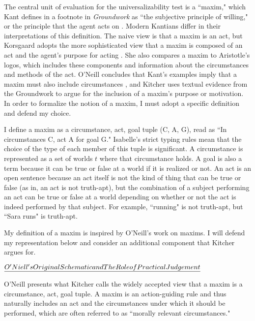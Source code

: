 \begin{isabellebody}
\begin{isamarkuptext}%
The central unit of evaluation for the universalizability test is a ``maxim," which Kant defines 
in a footnote in \emph{Groundwork} as ``the subjective principle of willing," or the principle that 
the agent acts on \cite[16]{groundwork}. Modern Kantians differ in their interpretations of this definition. The naive view 
is that a maxim is an act, but Korsgaard adopts the more sophisticated view that a maxim is composed
of an act and the agent's purpose for acting \cite{actingforareason}. She also compares a maxim 
to Aristotle's logos, which includes these components and information about the circumstances and methods 
of the act. O'Neill concludes that Kant's examples imply that a maxim must also include circumstances \cite{actingonprinciple}, and 
Kitcher \cite{whatisamaxim} uses textual evidence from the Groundwork to argue for the inclusion of a maxim's purpose 
or motivation. In order to formalize the notion of a maxim, I must adopt a specific definition and 
defend my choice.

I define a maxim as a circumstance, act, goal tuple (C, A, G), read 
as ``In circumstances C, act A for goal G." Isabelle's strict typing rules mean that the choice of the 
type of each member of this tuple is significant. A circumstance is represented as a set of worlds 
$t$ where that circumstance holds. A goal is also a term because it can be true or false at a world if it 
is realized or not. An act is an open sentence because an act itself is not the kind of thing that can 
be true or false (as in, an act is not truth-apt), but the combination of a subject performing an act 
can be true or false at a world depending on whether or not the act is indeed performed by that subject. 
For example, ``running" is not truth-apt, but ``Sara runs" is truth-apt.

My definition of a maxim is inspired by O'Neill's work on maxims. I will defend my representation
below and consider an additional component that Kitcher argues for.

$\emph{O'Niell's Original Schematic and The Role of Practical Judgement}$

O'Neill \cite[37]{actingonprinciple} presents what Kitcher \cite{whatisamaxim}  calls the widely accepted 
view that a maxim is a circumstance, act, goal tuple. A maxim 
is an action-guiding rule and thus naturally includes an act and the circumstances under which 
it should be performed, which are often referred to as ``morally relevant circumstances." 


\end{isamarkuptext}
\end{isabellebody}
